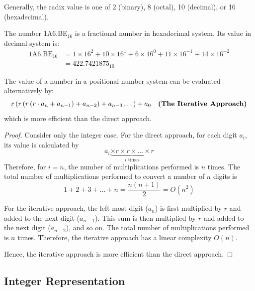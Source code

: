 Generally, the radix value is one of 2 (binary), 8 (octal), 10 (decimal), or 16 (hexadecimal).

\begin{example}
    The number 1A6.BE$_{16}$ is a fractional number in hexadecimal system. Its value in decimal system is:
    \begin{align*}
        \text{1A6.BE}_{16} &=
            1\times 16^2 + 10\times 16^1 + 6\times 16^0 + 11\times 16^{-1} + 14\times 16^{-2} \\
            &= 422.7421875_{10}
    \end{align*}
\end{example}

\begin{theorem}
    The value of a number in a positional number system can be evaluated alternatively by:
    \begin{equation}\label{eq:positional-number-system-value-iterative}
        r\left(r\left(r\left(r\cdot a_n + a_{n-1}\right)+ a_{n-2}\right)+ a_{n-3} \dots\right) + a_0
        \quad \text{\bfseries (The Iterative Approach)}
    \end{equation}
    which is more efficient than the direct approach.
\end{theorem}

\begin{proof}
    Consider only the integer case.
    For the direct approach, for each digit $a_i$, its value is calculated by \[
        a_i \underbrace{\times r \times r \times \dots \times r}_{i\text{ times}}
    \] Therefore, for $i=n$, the number of multiplications performed is $n$ times.
    The total number of multiplications performed to convert a number of $n$ digits is \[
        1+2+3+\dots+n = \frac{n(n+1)}{2} = O(n^2)
    \]

    For the iterative approach, the left most digit ($a_n$) is first multiplied by $r$ and added to
    the next digit ($a_{n-1}$). This sum is then multiplied by $r$ and added to the next digit
    ($a_{n-2}$), and so on. The total number of multiplications performed is $n$ times. Therefore,
    the iterative approach has a linear complexity $O(n)$.

    Hence, the iterative approach is more efficient than the direct approach.
\end{proof}

\subsection{Integer Representation}

